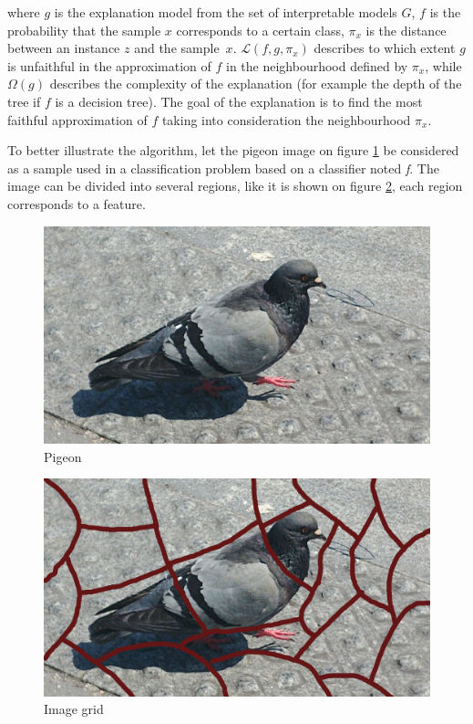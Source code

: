 \noindent where $g$ is the explanation model from the set of interpretable models $G$, $f$ is the probability that the sample $x$ corresponds to a certain class, $\pi_x$ is the distance between an instance $z$ and the sample~$x$. $\mathcal{L}(f, g, \pi_x)$ describes to which extent $g$ is unfaithful in the approximation of $f$ in the neighbourhood defined by $\pi_x$, while $\Omega(g)$ describes the complexity of the explanation (for example the depth of the tree if $f$ is a decision tree). The goal of the explanation is to find the most faithful approximation of $f$ taking into consideration the neighbourhood $\pi_x$.

To better illustrate the algorithm, let the pigeon image on figure \ref{fig:limepigeon} be considered as a sample used in a classification problem based on a classifier noted \textit{f}. The image can be divided into several regions, like it is shown on figure \ref{fig:limediv}, each region corresponds to a feature.

\begin{minipage}{.45\textwidth}
    \begin{figure}[H]
        \centering
        \includegraphics[width=\linewidth]{images/lime/pigeon}
        \caption{Pigeon}
        \label{fig:limepigeon}
    \end{figure}
\end{minipage}
\begin{minipage}{.45\textwidth}
    \begin{figure}[H]
        \centering
        \includegraphics[width=\linewidth]{images/lime/grid}
        \caption{Image grid}
        \label{fig:limediv}
    \end{figure}
\end{minipage}
\vspace{0.5cm}

